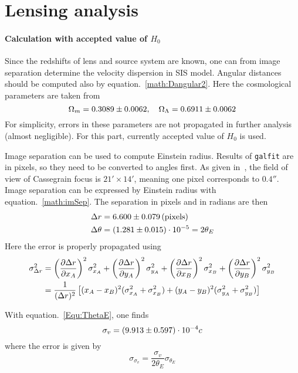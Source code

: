 \clearpage
\section{Lensing analysis} 
\paragraph{Calculation with accepted value of $H_0$}
Since the redshifts of lens and source system are known, one can from image separation determine the velocity dispersion in SIS model. Angular distances should be computed also by equation.~\ref{math:Dangular2}. Here the cosmological parameters are taken from~\cite{planck}
\begin{equation*}
	\Omega_m = \num{0.3089 +- 0.0062}, \quad \Omega_\Lambda=\num{0.6911 +- 0.0062}
\end{equation*}
For simplicity, errors in these parameters are not propagated in further analysis (almost negligible). For this part, currently accepted value of $H_0$ is used.

Image separation can be used to compute Einstein radius. Results of \verb|galfit| are in pixels, so they need to be converted to angles first. As given in~\cite{alfa-manual}, the field of view of Cassegrain focus is $21'\times14'$, meaning one pixel corresponds to $0.4''$. Image separation can be expressed by Einstein radius with equation.~\ref{math:imSep}. The separation in pixels and in radians are then
\begin{align*}
	\Delta r &= \num{6.60 +- 0.079} \, \text{(pixels)} \\
	\Delta \theta &= (\num{1.281 +-0.015}) \cdot 10^{-5} = 2 \theta_E
\end{align*}
Here the error is properly propagated using
\begin{align*}
	\sigma_{\Delta r} ^2 &= \left( \pdv{\Delta r}{x_A}  \right)^2 \sigma_{x_A}^2 + \left( \pdv{\Delta r}{y_A}  \right)^2 \sigma_{y_A}^2 + \left( \pdv{\Delta r}{x_B}  \right)^2 \sigma_{x_B}^2 + \left( \pdv{\Delta r}{y_B}  \right)^2 \sigma_{y_B}^2 \\
								&= \frac{1}{(\Delta r)^2} \left[ (x_A - x_B)^2(\sigma_{x_A}^2 + \sigma_{x_B}^2) + (y_A - y_B)^2 (\sigma_{y_A}^2 + \sigma_{y_B}^2) \right]
\end{align*}

With equation.~\ref{Equ:ThetaE}, one finds
\begin{equation}
	\sigma_v = (\num{9.913 +- 0.597 })\cdot 10^{-4} c
\end{equation}
where the error is given by
\begin{equation*}
	\sigma_{\sigma_v} = \frac{\sigma_v}{2\theta_E} \sigma_{\theta_E}
\end{equation*}

